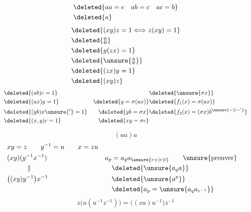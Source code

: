 \[
\begin{aligned}
&\deleted{aa=e\quad ab=c\quad ac=b}\\
&\deleted{a}
\end{aligned}
\]
\[
\begin{aligned}
&\deleted{(xy)z=1\Longleftrightarrow z(xy)=1}\\
&\deleted{\Updownarrow}\\
&\deleted{y(zx)=1}\\
&\deleted{\unsure{\Updownarrow}}\\
&\deleted{(zx)y=1}\\
&\deleted{(xy)z}
\end{aligned}
\]
\[
\begin{aligned}
&\deleted{(ab)c=1}&&\deleted{\unsure{\sigma x}}\\
&\deleted{(ax)y=1}&\deleted{y=\sigma(ax)}&\deleted{f_1(x)=\sigma(ax)}\\
&\deleted{(yb)x\unsure{'}=1}&\deleted{yb=\sigma x}&\deleted{f_2(x)=(\sigma x)b^{\unsure{-1|-'}}}\\
&\deleted{(x,y)c=1}&\deleted{xy=\sigma c}
\end{aligned}
\]

\[
(aa)a
\]
\[
\begin{aligned}
&xy=z\qquad y^{-1}=u\qquad x=zu\\
&(xy)(y^{-1}x^{-1})&a_p&=a_q a_{\unsure{r+|r|t}}\qquad\unsure{\text{prouver}}\\
&\hspace{3em}\|&&\deleted{\unsure{a_q a}}\\
&\bigl((xy)y^{-1}\bigr)x^{-1}&&\deleted{\unsure{a^p}}\\
&&&\deleted{a_p=\unsure{a_q a_{r^{-1}}}}
\end{aligned}
\]
\[
z\bigl(u(u^{-1}z^{-1})\bigr)=\bigl((zu)u^{-1}\bigr)z^{-1}
\]
